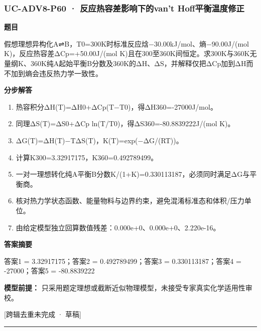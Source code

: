 \documentclass[UTF8,11pt,a4paper]{ctexart}
\begin{document}
\subsubsection*{UC-ADV8-P60 · 反应热容差影响下的van't Hoff平衡温度修正}
\noindent\textbf{题目}\par
假想理想异构化A⇌B，T0=300K时标准反应焓−30.00kJ/mol、熵−90.00J/(mol K)，反应热容差ΔCp=+50.00J/(mol K)且在300至360K间恒定。求300K与360K无量纲K、360K纯A起始平衡B分数及360K的ΔH、ΔS，并解释仅把ΔCp加到ΔH而不加到熵会违反热力学一致性。\par
\medskip\noindent\textbf{分步解答}
\begin{enumerate}
\item 热容积分ΔH(T)=ΔH0+ΔCp(T−T0)，得ΔH360=-27000J/mol。
\item 同理ΔS(T)=ΔS0+ΔCp ln(T/T0)，得ΔS360=-80.8839222J/(mol K)。
\item ΔG(T)=ΔH(T)−TΔS(T)，K(T)=exp(−ΔG/(RT))。
\item 计算K300=3.32917175，K360=0.492789499。
\item 一对一理想转化纯A平衡B分数K/(1+K)=0.330113187，必须同时满足ΔG与平衡商。
\item 核对热力学状态函数、能量物料与边界约束，避免混淆标准态和体积/压力单位。
\item 由给定模型独立回算数值残差：0.000e+0、0.000e+0、2.220e-16。
\end{enumerate}
\noindent\textbf{答案摘要}\par
答案1 = 3.32917175；答案2 = 0.492789499；答案3 = 0.330113187；答案4 = -27000；答案5 = -80.8839222\par
\noindent\textbf{模型前提：}
只采用题定理想或截断近似物理模型，未接受专家真实化学适用性审校。\par
\noindent\textcolor{red!65!black}{[跨辑去重未完成 · 草稿]} \par
\medskip\hrule\medskip
{}
\end{document}
